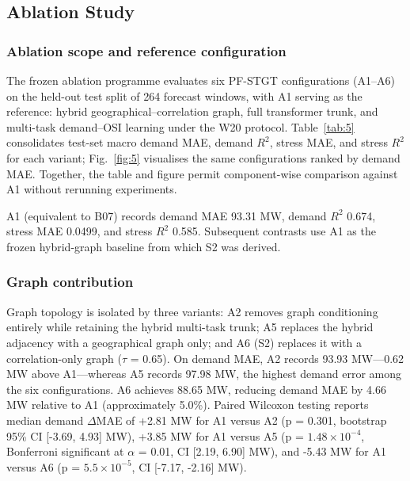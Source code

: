 \subsection{Ablation Study}\label{subsection:ablation_study}

\subsubsection{Ablation scope and reference configuration}\label{subsubsection:ablation_scope_and_reference_configuration}

The frozen ablation programme evaluates six PF-STGT configurations (A1--A6) on the held-out test split of 264 forecast windows, with A1 serving as the reference: hybrid geographical--correlation graph, full transformer trunk, and multi-task demand--OSI learning under the W20 protocol. Table~\ref{tab:5} consolidates test-set macro demand MAE, demand $R^2$, stress MAE, and stress $R^2$ for each variant; Fig.~\ref{fig:5} visualises the same configurations ranked by demand MAE. Together, the table and figure permit component-wise comparison against A1 without rerunning experiments.

A1 (equivalent to B07) records demand MAE 93.31 MW, demand $R^2$ 0.674, stress MAE 0.0499, and stress $R^2$ 0.585. Subsequent contrasts use A1 as the frozen hybrid-graph baseline from which S2 was derived.

\subsubsection{Graph contribution}\label{subsubsection:graph_contribution}

Graph topology is isolated by three variants: A2 removes graph conditioning entirely while retaining the hybrid multi-task trunk; A5 replaces the hybrid adjacency with a geographical graph only; and A6 (S2) replaces it with a correlation-only graph ($\tau$ = 0.65). On demand MAE, A2 records 93.93 MW---0.62 MW above A1---whereas A5 records 97.98 MW, the highest demand error among the six configurations. A6 achieves 88.65 MW, reducing demand MAE by 4.66 MW relative to A1 (approximately 5.0\%). Paired Wilcoxon testing reports median demand $\Delta$MAE of +2.81 MW for A1 versus A2 (p = 0.301, bootstrap 95\% CI [-3.69, 4.93] MW), +3.85 MW for A1 versus A5 (p = $1.48 \times 10^{-4}$, Bonferroni significant at $\alpha$ = 0.01, CI [2.19, 6.90] MW), and -5.43 MW for A1 versus A6 (p = $5.5 \times 10^{-5}$, CI [-7.17, -2.16] MW).

